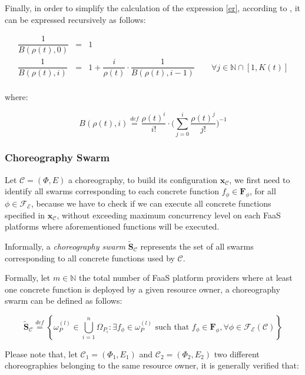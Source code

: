 \documentclass[12pt,a4paper]{report}
\newcommand{\mathDef}{\overset{\textit{def}}{=}}
\newcommand{\N}{\mathbb{N}}
\newcommand{\SetFromOneTo}[1]{\N \cap \left[1,#1\right]}
\begin{document}
Finally, in order to simplify the calculation of the expression \ref{er}, according to \cite{ERLANG}, it can be expressed  recursively as follows:

\begin{eqnarray}
	\dfrac{1}{B(\rho(t),0)} & = & 1 \\
	\dfrac{1}{B(\rho(t),i)} & = & 1 + \dfrac{i}{\rho(t)} \cdot \dfrac{1}{B(\rho(t),i-1)} \qquad \forall j \in \SetFromOneTo{K(t)} \\
\end{eqnarray}

where:

\begin{equation}
	B(\rho(t),i) \mathDef \dfrac{\rho(t)^{i}}{i!} \cdot \Bigg( \displaystyle\sum_{j=0}^{i} \dfrac{\rho(t)^j}{j!}\Bigg)^{-1}
\end{equation}

\subsubsection{Choreography Swarm}

Let $\mathcal{C} = (\Phi,E)$ a choreography, to build its configuration $\textbf{x}_{\mathcal{C}}$, we first need to identify all swarms corresponding to each concrete function $f_{\phi} \in \textbf{F}_{\phi}$, for all $\phi \in \mathscr{F_E}$, because we have to check if we can execute all concrete functions specified in $\textbf{x}_{\mathcal{C}}$, without exceeding maximum concurrency level on each FaaS platforms where aforementioned functions will be executed.

Informally, a \textit{choreography swarm} $\widetilde{\textbf{S}}_{\mathcal{C}}$ represents the set of all swarms corresponding to all concrete functions used by $\mathcal{C}$. 

Formally, let $m \in \N$ the total number of FaaS platform providers where at least one concrete function is deployed by a given resource owner, a choreography swarm can be defined as follows:

\begin{equation}
	\widetilde{\textbf{S}}_{\mathcal{C}} \mathDef \left\{ \omega_{P}^{(l)} \in \bigcup_{i=1}^n \Omega_{P_i} : \exists f_{\phi} \in \omega_{P}^{(l)} \text{ such that } f_{\phi} \in \textbf{F}_{\phi}, \forall \phi \in \mathscr{F_E}(\mathcal{C}) \right\}
\end{equation}

Please note that, let $\mathcal{C}_1 = (\Phi_1,E_1)$ and $\mathcal{C}_2 = (\Phi_2,E_2)$ two different choreographies belonging to the same resource owner, it is generally verified that:
\end{document}

